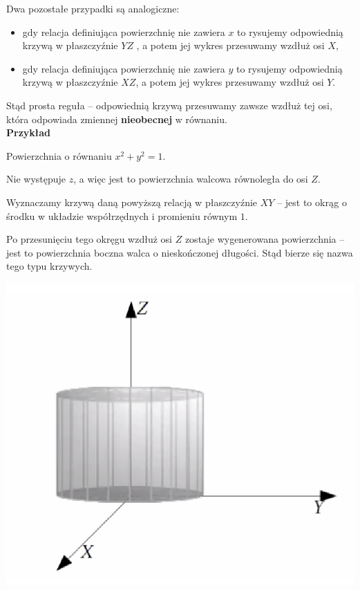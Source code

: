 Dwa pozostałe przypadki są analogiczne:

\begin{itemize}
    \item gdy relacja definiująca powierzchnię nie zawiera $x$ to rysujemy odpowiednią krzywą w płaszczyźnie $YZ$
    , a potem jej wykres przesuwamy wzdłuż osi $X$,
    \item gdy relacja definiująca powierzchnię nie zawiera $y$ to rysujemy odpowiednią krzywą w płaszczyźnie $XZ$,
    a potem jej wykres przesuwamy wzdłuż osi $Y$.
\end{itemize}

Stąd prosta reguła -- odpowiednią krzywą przesuwamy zawsze wzdłuż tej osi, która odpowiada zmiennej \textbf{nieobecnej} w równaniu. \\

\textbf{Przykład}

Powierzchnia o równaniu $ x^2 + y^2 = 1 $.

Nie występuje $z$, a więc jest to powierzchnia walcowa równoległa do osi $Z$.

Wyznaczamy krzywą daną powyższą relacją w płaszczyźnie $XY$ -- jest to okrąg o środku w układzie współrzędnych i promieniu równym $1$.

Po przesunięciu tego okręgu wzdłuż osi $Z$ zostaje wygenerowana powierzchnia -- jest to powierzchnia boczna walca o nieskończonej długości.
Stąd bierze się nazwa tego typu krzywych.

\begin{center}
\includegraphics[scale=0.6]{img/walec.png}
\end{center}

